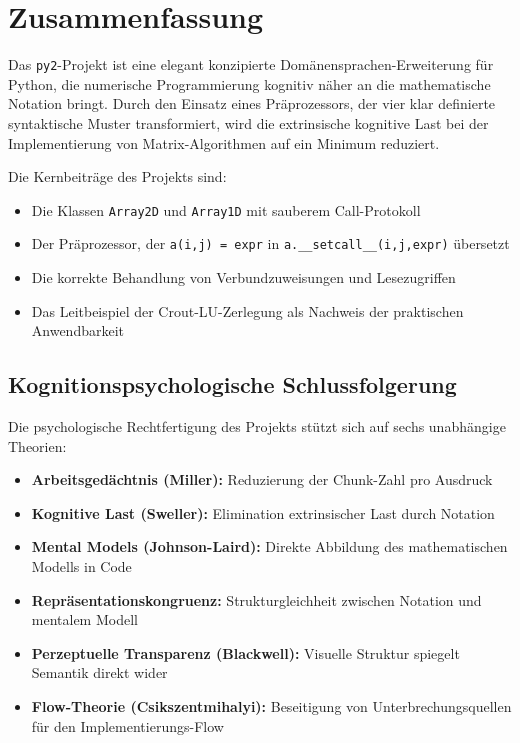 \documentclass[a4paper,12pt]{article}
\theoremstyle{definition}
\begin{document}
\section{Zusammenfassung}

Das \texttt{py2}-Projekt ist eine elegant konzipierte Dom\"anensprachen-Erweiterung
f\"ur Python, die numerische Programmierung kognitiv n\"aher an die mathematische
Notation bringt. Durch den Einsatz eines Pr\"aprozessors, der vier klar definierte
syntaktische Muster transformiert, wird die extrinsische kognitive Last bei der
Implementierung von Matrix-Algorithmen auf ein Minimum reduziert.

Die Kernbeitr\"age des Projekts sind:

\begin{itemize}
	\item Die Klassen \texttt{Array2D} und \texttt{Array1D} mit sauberem Call-Protokoll
	\item Der Pr\"aprozessor, der \texttt{a(i,j) = expr} in \texttt{a.\_\_setcall\_\_(i,j,expr)}
	      \"ubersetzt
	\item Die korrekte Behandlung von Verbundzuweisungen und Lesezugriffen
	\item Das Leitbeispiel der Crout-LU-Zerlegung als Nachweis der praktischen Anwendbarkeit
\end{itemize}

\subsection{Kognitionspsychologische Schlussfolgerung}

Die psychologische Rechtfertigung des Projekts st\"utzt sich auf sechs unabh\"angige
Theorien:

\begin{itemize}
	\item \textbf{Arbeitsged\"achtnis (Miller):} Reduzierung der Chunk-Zahl pro Ausdruck
	\item \textbf{Kognitive Last (Sweller):} Elimination extrinsischer Last durch Notation
	\item \textbf{Mental Models (Johnson-Laird):} Direkte Abbildung des mathematischen
	      Modells in Code
	\item \textbf{Repr\"asentationskongruenz:} Strukturgleichheit zwischen Notation
	      und mentalem Modell
	\item \textbf{Perzeptuelle Transparenz (Blackwell):} Visuelle Struktur spiegelt
	      Semantik direkt wider
	\item \textbf{Flow-Theorie (Csikszentmihalyi):} Beseitigung von Unterbrechungsquellen
	      f\"ur den Implementierungs-Flow
\end{itemize}
\end{document}
